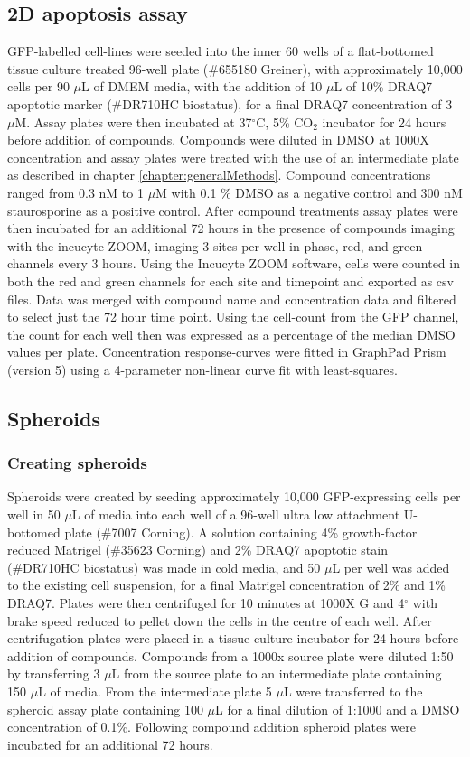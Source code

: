 \documentclass[a4paper,11pt,twoside,openright]{scrbook}
\begin{document}
\subsection{2D apoptosis assay}

GFP-labelled cell-lines were seeded into the inner 60 wells of a flat-bottomed tissue culture treated 96-well plate 
(\#655180 Greiner), with approximately 10,000 cells per 90 $\mu$L of DMEM media, with the addition of 10 $\mu$L of 10\% 
DRAQ7 apoptotic marker (\#DR710HC biostatus), for a final DRAQ7 concentration of 3 $\mu$M.
Assay plates were then incubated at 37$^\circ$C, 5\% CO$_2$ incubator for 24 hours before addition of compounds.
Compounds were diluted in DMSO at 1000X concentration and assay plates were treated with the use of an intermediate 
plate as described in chapter \ref{chapter:generalMethods}.
Compound concentrations ranged from 0.3 nM to 1 $\mu$M with 0.1 \% DMSO as a negative control and 300 nM staurosporine 
as a positive control.
After compound treatments assay plates were then incubated for an additional 72 hours in the presence of compounds 
imaging with the incucyte ZOOM, imaging 3 sites per well in phase, red, and green channels every 3 hours.
Using the Incucyte ZOOM software, cells were counted in both the red and green channels for each site and timepoint and 
exported as csv files.
Data was merged with compound name and concentration data and filtered to select just the 72 hour time point.
Using the cell-count from the GFP channel, the count for each well then was expressed as a percentage of the median 
DMSO values per plate.
Concentration response-curves were fitted in GraphPad Prism (version 5) using a 4-parameter non-linear curve fit with 
least-squares.


\subsection{Spheroids}

\subsubsection{Creating spheroids}
Spheroids were created  by seeding approximately 10,000 GFP-expressing cells per well in 50 $\mu$L of media into each 
well of a 96-well ultra low attachment U-bottomed plate (\#7007 Corning).
A solution containing 4\% growth-factor reduced Matrigel (\#35623 Corning) and 2\% DRAQ7 apoptotic stain (\#DR710HC 
biostatus) was made in cold media, and 50 $\mu$L per well was added to the existing cell suspension, for a final 
Matrigel concentration of 2\% and 1\% DRAQ7.
Plates were then centrifuged for 10 minutes at 1000X G and 4$^\circ$ with brake speed reduced to pellet down the cells 
in the centre of each well.
After centrifugation plates were placed in a tissue culture incubator for 24 hours before addition of compounds.
Compounds from a 1000x source plate were diluted 1:50 by transferring 3 $\mu$L from the source plate to an intermediate 
plate containing 150 $\mu$L of media.
From the intermediate plate 5 $\mu$L were transferred to the spheroid assay plate containing 100 $\mu$L for a final 
dilution of 1:1000 and a DMSO concentration of 0.1\%.
Following compound addition spheroid plates were incubated for an additional 72 hours.
\end{document}
